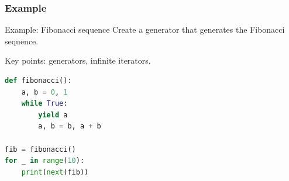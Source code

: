 \documentclass[beamer, en, version=2.0]{huangfusl-template}
\begin{document}
    \begin{frame}[fragile]
        \frametitle{Example}

        \begin{block}{Example: Fibonacci sequence}
            Create a generator that generates the Fibonacci sequence.
        \end{block}

        Key points: generators, infinite iterators.

        \pause

\begin{lstlisting}[language=python]
def fibonacci():
    a, b = 0, 1
    while True:
        yield a
        a, b = b, a + b

fib = fibonacci()
for _ in range(10):
    print(next(fib))
\end{lstlisting}
    \end{frame}
\end{document}
